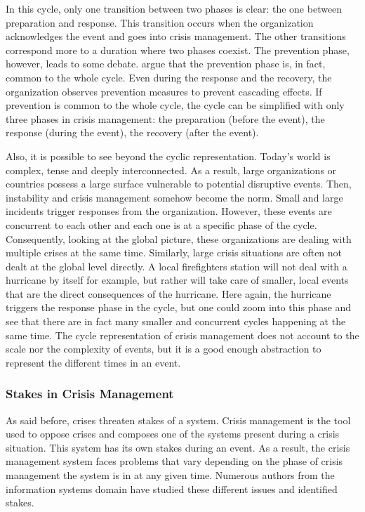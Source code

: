 In this cycle, only one transition between two phases is clear: the one between preparation and response.
This transition occurs when the organization acknowledges the event and goes into crisis management.
The other transitions correspond more to a duration where two phases coexist.
The prevention phase, however, leads to some debate.
\textcite{benabenCollaborativeSystemsCrisis2014} argue that the prevention phase is, in fact, common to the whole cycle.
Even during the response and the recovery, the organization observes prevention measures to prevent cascading effects.
If prevention is common to the whole cycle, the cycle can be simplified with only three phases in crisis management: the preparation (before the event), the response (during the event), the recovery (after the event).

Also, it is possible to see beyond the cyclic representation.
Today's world is complex, tense and deeply interconnected. %
As a result, large organizations or countries possess a large surface vulnerable to potential disruptive events.
Then, instability and crisis management somehow become the norm.
Small and large incidents trigger responses from the organization.
However, these events are concurrent to each other and each one is at a specific phase of the cycle.
Consequently, looking at the global picture, these organizations are dealing with multiple crises at the same time.
Similarly, large crisis situations are often not dealt at the global level directly.
A local firefighters station will not deal with a hurricane by itself for example, but rather will take care of smaller, local events that are the direct consequences of the hurricane.
Here again, the hurricane triggers the response phase in the cycle, but one could zoom into this phase and see that there are in fact many smaller and concurrent cycles happening at the same time.
The cycle representation of crisis management does not account to the scale nor the complexity of events, but it is a good enough abstraction to represent the different times in an event.

\subsubsection{Stakes in Crisis Management}
As said before, crises threaten stakes of a system.
Crisis management is the tool used to oppose crises and composes one of the systems present during a crisis situation.
This system has its own stakes during an event.
As a result, the crisis management system faces problems that vary depending on the phase of crisis management the system is in at any given time.
Numerous authors from the information systems domain have studied these different issues and identified stakes.

